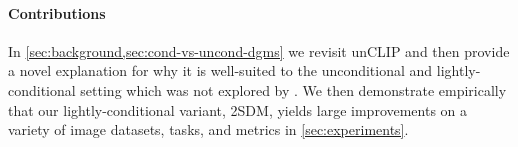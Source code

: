 \paragraph{Contributions} In \cref{sec:background,sec:cond-vs-uncond-dgms} we revisit unCLIP and then provide a novel explanation for why it is well-suited to the unconditional and lightly-conditional setting which was not explored by \citet{ramesh2022hierarchical}. We then demonstrate empirically that our lightly-conditional variant, 2SDM, yields large improvements on a variety of image datasets, tasks, and metrics in \cref{sec:experiments}.











